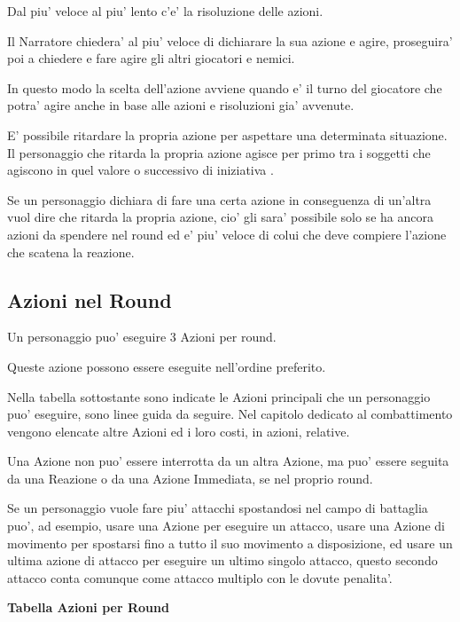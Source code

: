 \documentclass[a4paper,11pt,twoside,openany]{dndbook}
\begin{document}
\label{risoluzione-delle-azioni}

Dal piu' veloce al piu' lento c'e' la risoluzione delle azioni.

Il Narratore chiedera' al piu' veloce di dichiarare la sua azione e agire, proseguira' poi a chiedere e fare agire gli altri giocatori e nemici.

In questo modo la scelta dell'azione avviene quando e' il turno del giocatore che potra' agire anche in base alle azioni e risoluzioni gia' avvenute.

E' possibile ritardare la propria azione per aspettare una determinata situazione. Il personaggio che ritarda la propria azione agisce per primo tra i soggetti che agiscono in quel valore o successivo di iniziativa .

Se un personaggio dichiara di fare una certa azione in conseguenza di un'altra vuol dire che ritarda la propria azione, cio' gli sara' possibile solo se ha ancora azioni da spendere nel round ed e' piu' veloce di colui che deve compiere l'azione che scatena la reazione.

\subsection{Azioni nel Round}

\label{azioni-nel-round}

Un personaggio puo' eseguire 3 Azioni per round.

Queste azione possono essere eseguite nell'ordine preferito.

Nella tabella sottostante sono indicate le Azioni principali che un personaggio puo' eseguire, sono linee guida da seguire. Nel capitolo dedicato al combattimento vengono elencate altre Azioni ed i loro costi, in azioni, relative.

Una Azione non puo' essere interrotta da un altra Azione, ma puo' essere seguita da una Reazione o da una Azione Immediata, se nel proprio round.

Se un personaggio vuole fare piu' attacchi spostandosi nel campo di battaglia puo', ad esempio, usare una Azione per eseguire un attacco, usare una Azione di movimento per spostarsi fino a tutto il suo movimento a disposizione, ed usare un ultima azione di attacco per eseguire un ultimo singolo attacco, questo secondo attacco conta comunque come attacco multiplo con le dovute penalita'.

\pagebreak

\textbf{Tabella Azioni per Round}
\end{document}
